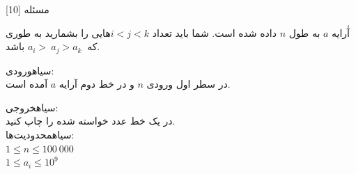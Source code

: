 ‌مسئله [10]


% 
%
%
% 
آٰرایه $a$ به طول $n$ داده شده است. شما باید تعداد $i < j < k$هایی را بشمارید به طوری که $a_i > \ a_j > a_k\ $ باشد. 

\noindent
{}‌سیاه{ورودی:}\\
در سطر اول ورودی $n$ و در خط دوم آرایه $a$ آمده‌ است.

\noindent
{}‌سیاه{خروجی:}\\
در یک خط عدد خواسته شده را چاپ کنید.
\\
‌سیاه{محدودیت‌ها:}\\
$1 \leq n \leq 100\ 000$ \\
$1 \leq a_i \leq 10^9$



